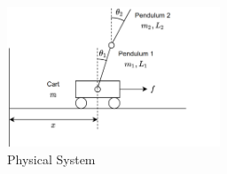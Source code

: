 \documentclass[journal]{IEEEtran}
\begin{document}

\begin{figure}[!t]
    \centering
    \includegraphics[width=2.5in]{fig01_cart001.png}
    \caption{Physical System}
    \label{fig_sim}
\end{figure}











\end{document}
